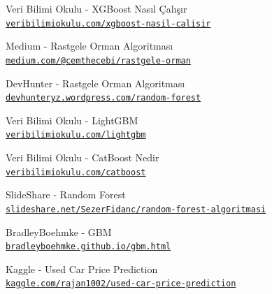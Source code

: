 \documentclass[conference]{IEEEtran}
\begin{document}
\begin{thebibliography}{17}
Veri Bilimi Okulu  - XGBoost Nasıl Çalışır
\\\texttt{\href{https://www.veribilimiokulu.com/xgboost-nasil-calisir/}{\nolinkurl{veribilimiokulu.com/xgboost-nasil-calisir}}}

Medium - Rastgele Orman Algoritması
\\\texttt{\href{https://medium.com/@cemthecebi/rastgele-orman-algoritması-1600ca4f4784}{\nolinkurl{medium.com/@cemthecebi/rastgele-orman}}}

DevHunter - Rastgele Orman Algoritması
\\\texttt{\href{https://devhunteryz.wordpress.com/2018/09/20/rastgele-ormanrandom-forest-algoritmasi/comment-page-1/}{\nolinkurl{devhunteryz.wordpress.com/random-forest}}}

Veri Bilimi Okulu - LightGBM
\\\texttt{\href{https://www.veribilimiokulu.com/lightgbm/}{\nolinkurl{veribilimiokulu.com/lightgbm}}}

Veri Bilimi Okulu - CatBoost Nedir
\\\texttt{\href{https://www.veribilimiokulu.com/catboost-nedir-diger-boosting-algoritmalarindan-farki-nelerdir/}{\nolinkurl{veribilimiokulu.com/catboost}}}

SlideShare - Random Forest
\\\texttt{\href{https://www.slideshare.net/SezerFidanc/random-forest-algoritmas}{\nolinkurl{slideshare.net/SezerFidanc/random-forest-algoritmasi}}}

BradleyBoehmke - GBM
\\\texttt{\href{https://bradleyboehmke.github.io/HOML/gbm.html}{\nolinkurl{bradleyboehmke.github.io/gbm.html}}}

Kaggle - Used Car Price Prediction
\\\texttt{\href{https://www.kaggle.com/rajan1002/used-car-price-prediction-r2-0-956}{\nolinkurl{kaggle.com/rajan1002/used-car-price-prediction}}}

\end{thebibliography}
\end{document}

